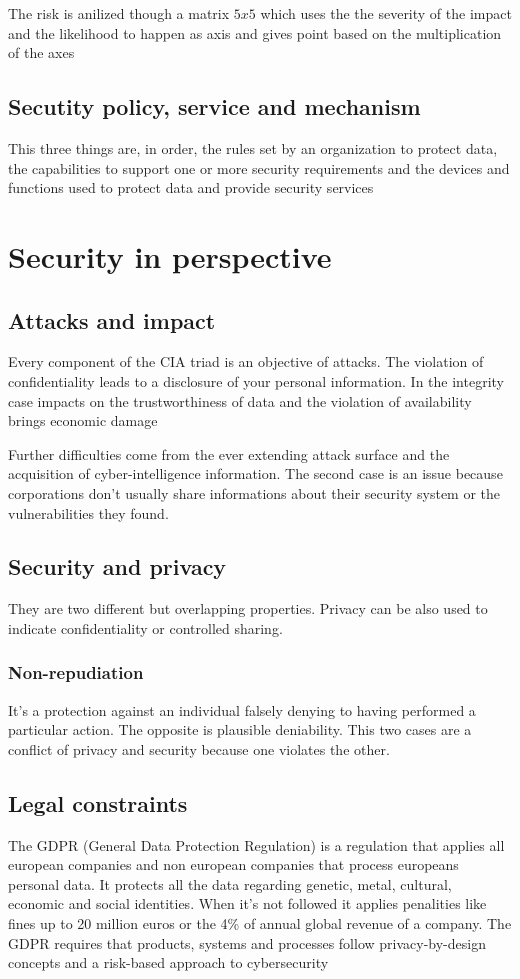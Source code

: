 \documentclass[12pt, a4paper]{article}
\begin{document}
The risk is anilized though a matrix $5x5$ which uses the the severity of the impact and the likelihood to happen as axis and gives point based on the
multiplication of the axes

\subsection{Secutity policy, service and mechanism}
This three things are, in order, the rules set by an organization to protect data, the capabilities to support one or more security requirements and the
devices and functions used to protect data and provide security services

\newpage
\section{Security in perspective}
\subsection{Attacks and impact}
Every component of the CIA triad is an objective of attacks. The violation of confidentiality leads to a disclosure of your personal
information. In the integrity case impacts on the trustworthiness of data and the violation of availability brings economic damage

Further difficulties come from the ever extending attack surface and the acquisition of cyber-intelligence information. The second case 
is an issue because corporations don't usually share informations about their security system or the vulnerabilities they found.

\subsection{Security and privacy}
They are two different but overlapping properties. Privacy can be also used to indicate confidentiality or controlled sharing.

\subsubsection*{Non-repudiation}
It's a protection against an individual falsely denying to having performed a particular action. The opposite is plausible 
deniability. This two cases are a conflict of privacy and security because one violates the other.

\subsection{Legal constraints}
The GDPR (General Data Protection Regulation) is a regulation that applies all european companies and non european companies
that process europeans personal data. It protects all the data regarding genetic, metal, cultural, economic and social identities.
When it's not followed it applies penalities like fines up to 20 million euros or the 4\% of annual global revenue of a company.
The GDPR requires that products, systems and processes follow privacy-by-design concepts and a risk-based approach to cybersecurity 
\end{document}
